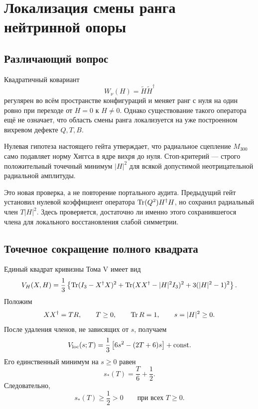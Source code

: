 \chapter{Локализация смены ранга нейтринной опоры}
\label{ch:v6-spectral-transition-rank-change-localization-gate}

\section{Различающий вопрос}

Квадратичный ковариант
\begin{equation}
 W_\nu(H)=\widetilde H\widetilde H^\dagger
\end{equation}
регулярен во всём пространстве конфигураций и меняет ранг с нуля на один
ровно при переходе от $H=0$ к $H\neq0$. Однако существование такого
оператора ещё не означает, что область смены ранга локализуется на уже
построенном вихревом дефекте $Q,T,B$.

Нулевая гипотеза настоящего гейта утверждает, что радиальное сцепление
$M_{300}$ само подавляет норму Хиггса в ядре вихря до нуля. Стоп-критерий
--- строго положительный точечный минимум $|H|^2$ для всякой допустимой
неотрицательной радиальной амплитуды.

Это новая проверка, а не повторение портального аудита. Предыдущий гейт
установил нулевой коэффициент оператора
$\operatorname{Tr}(Q^2)H^\dagger H$, но сохранил радиальный член $T|H|^2$. Здесь
проверяется, достаточно ли именно этого сохранившегося члена для
локального восстановления слабой симметрии.

\section{Точечное сокращение полного квадрата}

Единый квадрат кривизны Тома V имеет вид
\begin{equation}
 V_H(X,H)=\frac13\left\{
 \operatorname{Tr}(I_3-X^\dagger X)^2+
 \operatorname{Tr}(XX^\dagger-|H|^2I_3)^2+
 3(|H|^2-1)^2\right\}.
 \label{eq:v6-rank-localization-parent-potential}
\end{equation}
Положим
\begin{equation}
 XX^\dagger=TR,
 \qquad T\geq0,
 \qquad \operatorname{Tr} R=1,
 \qquad s=|H|^2\geq0.
\end{equation}
После удаления членов, не зависящих от $s$, получаем
\begin{equation}
 V_{\rm loc}(s;T)=\frac13\left[6s^2-(2T+6)s\right]+\mathrm{const}.
 \label{eq:v6-rank-localization-reduced-potential}
\end{equation}
Его единственный минимум на $s\geq0$ равен
\begin{equation}
 s_*(T)=\frac{T}{6}+\frac12.
 \label{eq:v6-rank-localization-current-minimum}
\end{equation}
Следовательно,
\begin{equation}
 s_*(T)\geq\frac12>0
 \qquad\text{при всех }T\geq0.
\end{equation}

